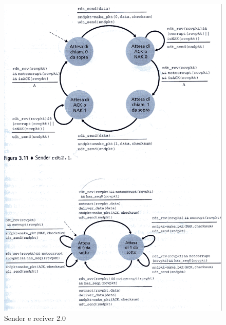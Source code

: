 \documentclass[11pt,a4paper]{book}
\begin{document}
\begin{figure}
		\includegraphics[scale=0.6]{img/019.png}
		\caption{Sender e reciver 2.0}
\end{figure}
\pagebreak
\end{document}
